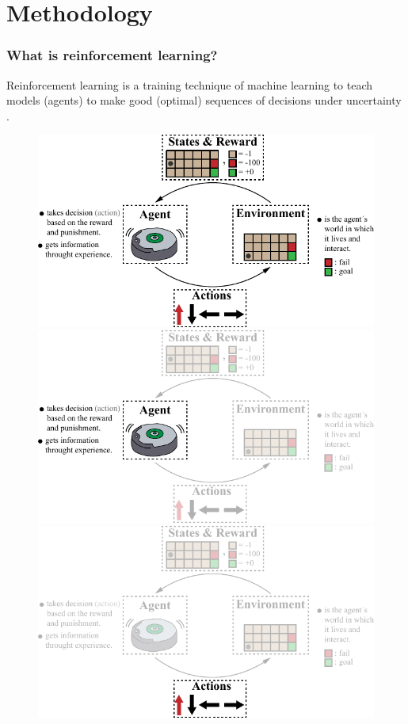 \graphicspath{{images/methodology/}}
\section{Methodology}
\begin{frame}
	\frametitle{What is reinforcement learning?}
	Reinforcement learning is a training technique of machine learning to teach models {\color{gray} (agents)} to make good {\color{gray} (optimal)} sequences of decisions under uncertainty \footnotemark[1].
	
	\begin{figure}
		\begin{overprint}
			\includegraphics{reinforcement_learning_diagram.pdf}
			\onslide<2>\includegraphics{reinforcement_learning_diagram_1.pdf}
			\onslide<3>\includegraphics{reinforcement_learning_diagram_2.pdf}

\end{overprint}
\end{figure}
\end{frame}
